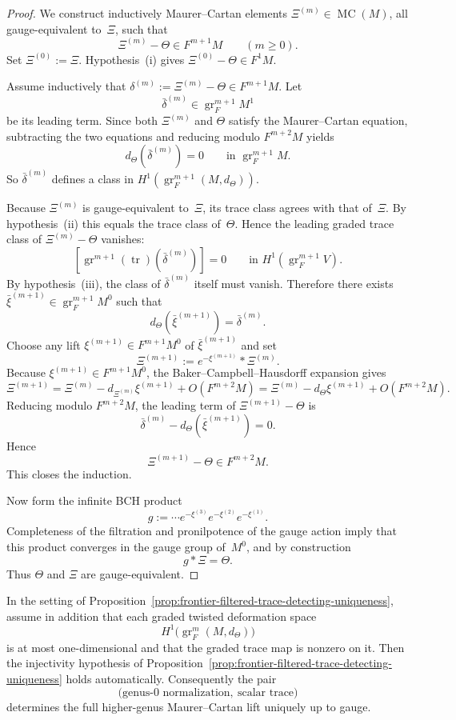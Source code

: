 \begin{proof}
We construct inductively Maurer--Cartan elements
$\Xi^{(m)}\in \operatorname{MC}(M)$, all gauge-equivalent to~$\Xi$, such
that
\[
\Xi^{(m)}-\Theta \in F^{m+1}M
\qquad (m\ge 0).
\]
Set $\Xi^{(0)}:=\Xi$.
Hypothesis~\textup{(i)} gives $\Xi^{(0)}-\Theta\in F^1M$.

Assume inductively that
$\delta^{(m)}:=\Xi^{(m)}-\Theta\in F^{m+1}M$.
Let
\[
\bar\delta^{(m)}\in \operatorname{gr}_F^{m+1}M^1
\]
be its leading term.
Since both $\Xi^{(m)}$ and $\Theta$ satisfy the Maurer--Cartan equation,
subtracting the two equations and reducing modulo $F^{m+2}M$ yields
\[
d_{\Theta}(\bar\delta^{(m)})=0
\qquad
\text{in }\operatorname{gr}_F^{m+1}M.
\]
So $\bar\delta^{(m)}$ defines a class in
$H^1(\operatorname{gr}_F^{m+1}(M,d_{\Theta}))$.

Because $\Xi^{(m)}$ is gauge-equivalent to~$\Xi$, its trace class agrees
with that of~$\Xi$.
By hypothesis~\textup{(ii)} this equals the trace class of~$\Theta$.
Hence the leading graded trace class of $\Xi^{(m)}-\Theta$ vanishes:
\[
[\operatorname{gr}^{m+1}(\operatorname{tr})(\bar\delta^{(m)})]=0
\qquad
\text{in }H^1(\operatorname{gr}_F^{m+1}V).
\]
By hypothesis~\textup{(iii)}, the class of $\bar\delta^{(m)}$ itself must
vanish.
Therefore there exists
$\bar\xi^{(m+1)}\in \operatorname{gr}_F^{m+1}M^0$ such that
\[
d_{\Theta}(\bar\xi^{(m+1)})=\bar\delta^{(m)}.
\]
Choose any lift $\xi^{(m+1)}\in F^{m+1}M^0$ of $\bar\xi^{(m+1)}$ and set
\[
\Xi^{(m+1)}:=e^{-\xi^{(m+1)}}*\Xi^{(m)}.
\]
Because $\xi^{(m+1)}\in F^{m+1}M^0$, the
Baker--Campbell--Hausdorff expansion gives
\[
\Xi^{(m+1)}
=
\Xi^{(m)}-d_{\Xi^{(m)}}\xi^{(m+1)}+O(F^{m+2}M)
=
\Xi^{(m)}-d_{\Theta}\xi^{(m+1)}+O(F^{m+2}M).
\]
Reducing modulo $F^{m+2}M$, the leading term of
$\Xi^{(m+1)}-\Theta$ is
\[
\bar\delta^{(m)}-d_{\Theta}(\bar\xi^{(m+1)})=0.
\]
Hence
\[
\Xi^{(m+1)}-\Theta\in F^{m+2}M.
\]
This closes the induction.

Now form the infinite BCH product
\[
g:=\cdots e^{-\xi^{(3)}}e^{-\xi^{(2)}}e^{-\xi^{(1)}}.
\]
Completeness of the filtration and pronilpotence of the gauge action imply
that this product converges in the gauge group of~$M^0$, and by
construction
\[
g*\Xi=\Theta.
\]
Thus $\Theta$ and $\Xi$ are gauge-equivalent.
\end{proof}

\begin{corollary}
\label{cor:frontier-scalar-saturated-modular-lift}
In the setting of
Proposition~\ref{prop:frontier-filtered-trace-detecting-uniqueness},
assume in addition that each graded twisted deformation space
\[
H^1\!\bigl(\operatorname{gr}_F^m(M,d_{\Theta})\bigr)
\]
is at most one-dimensional and that the graded trace map is nonzero on it.
Then the injectivity hypothesis of
Proposition~\ref{prop:frontier-filtered-trace-detecting-uniqueness} holds
automatically.
Consequently the pair
\[
\bigl(\text{genus-$0$ normalization},\ \text{scalar trace}\bigr)
\]
determines the full higher-genus Maurer--Cartan lift uniquely up to gauge.
\end{corollary}

